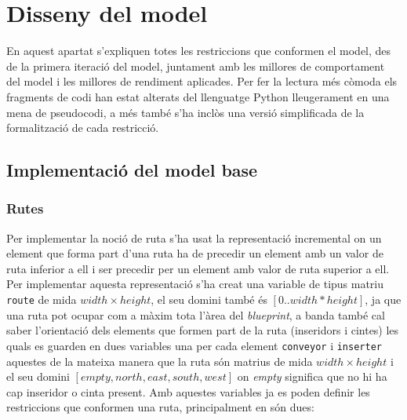 


\chapter{Disseny del model} \label{disseny model} %

\label{Disseny del model} %
En aquest apartat s'expliquen totes les restriccions que conformen el model, des de la primera iteració del model, juntament amb les millores de comportament del model i les millores de rendiment aplicades. Per fer la lectura més còmoda els fragments de codi han estat alterats del llenguatge Python lleugerament en una mena de pseudocodi, a més també s'ha inclòs una versió simplificada de la formalització de cada restricció.


\section{Implementació del model base}\label{model-base}

\subsection{Rutes}
Per implementar la noció de ruta s'ha usat la representació incremental on un element que forma part d'una ruta ha de precedir un element amb un valor de ruta inferior a ell i ser precedir per un element amb valor de ruta superior a ell. Per implementar aquesta representació s'ha creat una variable de tipus matriu \texttt{route} de mida $width \times height$, el seu domini també és $[0..width * height]$, ja que una ruta pot ocupar com a màxim tota l'àrea del \textit{blueprint}, a banda també cal saber l'orientació dels elements que formen part de la ruta (inseridors i cintes) les quals es guarden en dues variables una per cada element \texttt{conveyor} i \texttt{inserter} aquestes de la mateixa manera que la ruta són matrius de mida $width \times height$ i el seu domini $[empty, north, east, south, west]$ on \textit{empty} significa que no hi ha cap inseridor o cinta present. Amb aquestes variables ja es poden definir les restriccions que conformen una ruta, principalment en són dues:

